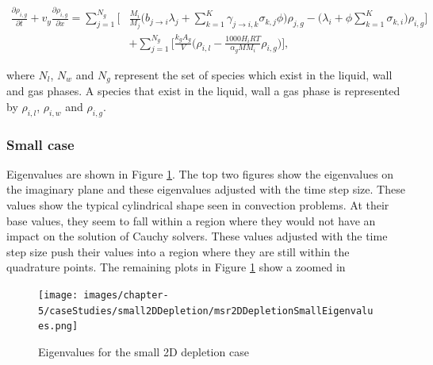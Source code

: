 \begin{equation}
\begin{split}
    \frac{\partial \rho_{i,g}}{\partial t} + v_{y}\frac{\partial \rho_{i,g}}{\partial x}
    =
    \sum_{j=1}^{N_{g}}\bigg[&\frac{M_{i}}{M_{j}}\bigg(b_{j\rightarrow i}\lambda_{j} + 
    \sum_{k=1}^{K}\gamma_{j\rightarrow i,k}\sigma_{k,j}\phi \bigg)\rho_{j, g}
    - \bigg(\lambda_{i} + \phi\sum_{k=1}^{K} \sigma_{k,i}\bigg)\rho_{i, g} \bigg]\\ & + \sum_{j=1}^{N_{g}} \bigg[  \frac{k_{g}A_{g}}{V}\bigg(\rho_{i,l} - \frac{1000H_{i}RT}{\alpha_{g}MM_{i}}\rho_{i, g}\bigg) \bigg],
    \label{eq:MSR2DDepletionSmallGasPhase}
\end{split}
\end{equation}

\noindent where $N_{l}$, $N_{w}$ and $N_{g}$ represent the set of species which exist in the liquid, wall and gas phases. A species that exist in the liquid, wall a gas phase is represented by $\rho_{i,l}$, $\rho_{i,w}$ and $\rho_{i,g}$.

\subsubsection{Small case}
Eigenvalues are shown in Figure \ref{fig:small_2D_depletion_eigenvalues}. The top two figures show the eigenvalues on the imaginary plane and these eigenvalues adjusted with the time step size. These values show the typical cylindrical shape seen in convection problems. At their base values, they seem to fall within a region where they would not have an impact on the solution of Cauchy solvers. These values adjusted with the time step size push their values into a region where they are still within the quadrature points. The remaining plots in Figure \ref{fig:small_2D_depletion_eigenvalues} show a zoomed in 

\clearpage

\begin{figure}[p]
    \centering
    \texttt{[image: images/chapter-5/caseStudies/small2DDepletion/msr2DDepletionSmallEigenvalues.png]}
    \caption{Eigenvalues for the small 2D depletion case}
    \label{fig:small_2D_depletion_eigenvalues}
\end{figure}

\clearpage

